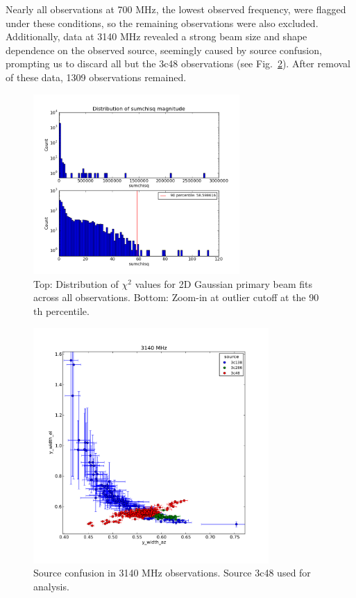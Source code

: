 \documentclass[preprint]{aastex}
\begin{document}
Nearly all observations at 700 MHz, the lowest observed frequency,
were flagged under these conditions, so the remaining observations
were also excluded.  Additionally, data at 3140 MHz revealed a strong
beam size and shape dependence on the observed source, seemingly
caused by source confusion, prompting us to discard all but the 3c48
observations (see Fig.~\ref{fig.source_confusion}). After removal of
these data, 1309 observations remained.

\begin{figure}[htb]
\begin{center}
\includegraphics[width=0.7\textwidth]{images/dist_sumchisq}
\caption{Top: Distribution of $\chi^2$ values for 2D Gaussian primary
  beam fits across all observations.  Bottom: Zoom-in at outlier
  cutoff at the 90$\textrm{th}$ percentile. \label{fig.dist_sumchisq}}
\end{center}
\end{figure}

\begin{figure}[htb]
\begin{center}
\includegraphics[width=0.8\textwidth]{images/source_confusion}
\caption{Source confusion in 3140 MHz observations.  Source 3c48 used
  for analysis. \label{fig.source_confusion}}
\end{center}
\end{figure}
\end{document}
